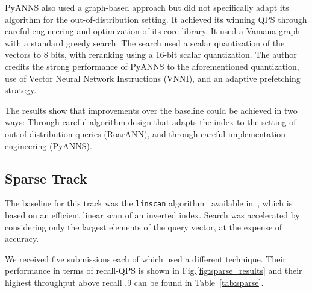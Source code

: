 PyANNS also used a graph-based approach but did not specifically adapt its algorithm for the out-of-distribution setting. It achieved its winning QPS through careful engineering and optimization of its core library. It used a Vamana graph with a standard greedy search. The search used a scalar quantization of the vectors to 8 bits, with reranking using a 16-bit scalar quantization. The author credits the strong performance of PyANNS to the aforementioned quantization, use of Vector Neural Network Instructions (VNNI), and an adaptive prefetching strategy. 

The results show that improvements over the baseline could be achieved in two ways: Through careful algorithm design that adapts the index to the setting of out-of-distribution queries (RoarANN), and through careful implementation engineering (PyANNS).



\subsection{Sparse Track}
The baseline for this track was  the \texttt{linscan} algorithm~\cite{bruch2023approximate} available in~\cite{Linscan-github},
which is based on an efficient linear scan of an inverted index. 
%
Search was accelerated by considering only the largest elements of the query vector,
at the expense of accuracy.
%


We received five submissions each of which used a different technique. 
Their performance in terms of recall-QPS is shown in Fig.\ref{fig:sparse_results} and their highest throughput above recall .9 can be found in Table~\ref{tab:sparse}. 

